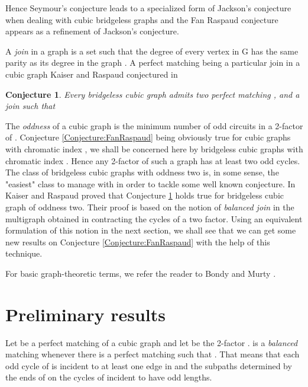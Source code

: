 \documentclass{elsart}
\theoremstyle{plain} \theoremheaderfont{\scshape}
\newtheorem{Conj}[Thm]{{\bf Conjecture}}
\begin{document}
Hence Seymour's conjecture leads to a  specialized form of Jackson's
conjecture when dealing with cubic bridgeless graphs and the Fan
Raspaud conjecture appears as a refinement of Jackson's conjecture.

 A {\em join} in a graph  is a set  such that the degree of every vertex in G has the same parity
as its degree in the graph . A perfect matching being a
particular join in a cubic graph Kaiser and Raspaud conjectured in
\cite{KaiRas}

\begin{Conj}\cite{KaiRas} \label{Conjecture:KaiserRaspaud} Every
bridgeless cubic graph admits two perfect matching ,  and
a join  such that

\end{Conj}


The {\em oddness} of a cubic graph  is the minimum number of odd
circuits in a 2-factor of . Conjecture
\ref{Conjecture:FanRaspaud} being obviously true for cubic graphs
with chromatic index , we shall be concerned here by bridgeless
cubic graphs with chromatic index . Hence any 2-factor of such a
graph has at least two odd cycles. The class of  bridgeless cubic
graphs with oddness two is, in some sense, the "easiest" class to
manage with in order to tackle some well known conjecture.  In
\cite{KaiRas} Kaiser and Raspaud proved that Conjecture
\ref{Conjecture:KaiserRaspaud} holds true for bridgeless cubic graph
of oddness  two. Their proof is based on the notion of {\em balanced
join} in the multigraph obtained in contracting the cycles of a two
factor. Using an equivalent formulation of this notion in the next
section, we shall see that we can get some new results on Conjecture
\ref{Conjecture:FanRaspaud} with the help of this technique.





For basic graph-theoretic terms, we refer the reader to Bondy and
Murty \cite{BonMur}.





\section{Preliminary results}
Let  be a perfect matching of a  cubic graph and let  be the 2-factor .  is
a {\em balanced} matching  whenever there is a perfect matching
 such that . That means that each odd cycle of
 is incident to at least one edge in  and the
subpaths determined by the ends of  on the cycles of  incident to  have odd lengths.
\end{document}
